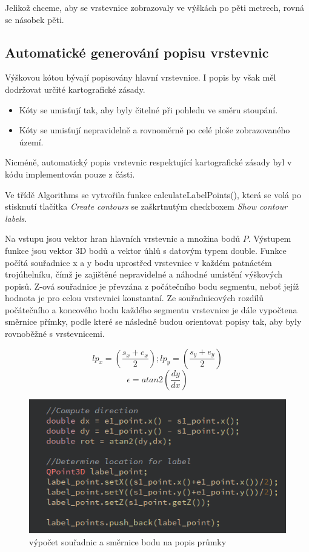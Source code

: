 \documentclass[11pt]{article}
\begin{document}
Jelikož chceme, aby se vrstevnice zobrazovaly ve výškách po pěti metrech, rovná se násobek pěti.

\subsection{Automatické generování popisu vrstevnic}
Výškovou kótou bývají popisovány hlavní vrstevnice. I popis by však měl dodržovat určité kartografické zásady.
\begin{itemize}
\item Kóty se umisťují tak, aby byly čitelné při pohledu ve směru stoupání.
\item Kóty se umisťují nepravidelně a rovnoměrně po celé ploše zobrazovaného území.
\end{itemize}

Nicméně, automatický popis vrstevnic respektující kartografické zásady byl v kódu implementován pouze z části. 

Ve třídě Algorithms se vytvořila funkce calculateLabelPoints(), která se volá po stisknutí tlačítka \textit{Create contours} se zaškrtnutým checkboxem \textit{Show contour labels}.

Na vstupu jsou vektor hran hlavních vrstevnic a množina bodů $P$. Výstupem funkce jsou vektor 3D bodů a vektor úhlů s datovým typem double. Funkce počítá souřadnice x a y bodu  uprostřed vrstevnice v každém patnáctém trojúhelníku, čímž je zajištěné nepravidelné a náhodné umístění výškových popisů. Z-ová souřadnice je převzána z počátečního bodu segmentu, neboť jejíž hodnota je pro celou vrstevnici konstantní. Ze souřadnicových rozdílů počátečního a koncového bodu každého segmentu vrstevnice je dále vypočtena směrnice přímky, podle které se následně budou orientovat popisy tak, aby byly rovnoběžné s vrstevnicemi.

$$ lp_x = ( \frac{s_x + e_x}{2});  lp_y = ( \frac{s_y + e_y}{2}) $$ 
$$ \epsilon = atan2( \frac{dy}{dx}) $$

\begin{figure}[htbh]
	\centering
	\includegraphics[scale=0.8]{images/getContourLabels.png} 
	\caption{výpočet souřadnic a směrnice bodu na popis průmky}
	\label{fig:getContourLines()}
\end{figure} 
\end{document}
